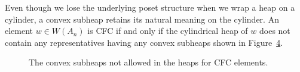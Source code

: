 \begin{remark}\label{rem:CFCcylinderwrap}
Even though we lose the underlying poset structure when we wrap a heap on a cylinder, a convex subheap retains its natural meaning on the cylinder.
    An element $w \in W(A_n)$ is CFC if and only if the cylindrical heap of $w$ does not contain any representatives having any convex subheaps shown in Figure~\ref{fig:convexsubheapsnotinCFC}.
    
\begin{center} \begin{figure}[htpb] \centering
\begin{subfigure}{0.25\textwidth} \centering
{}
\caption{}\label{}
\end{subfigure}
\begin{subfigure}{0.25\textwidth} \centering
{}
\caption{}\label{}
\end{subfigure}
\begin{subfigure}{0.25\textwidth} \centering
{}
\caption{}\label{}
\end{subfigure}
\caption{The convex subheaps not allowed in the heaps for CFC elements.}\label{fig:convexsubheapsnotinCFC}
\end{figure} \end{center}
\end{remark}

